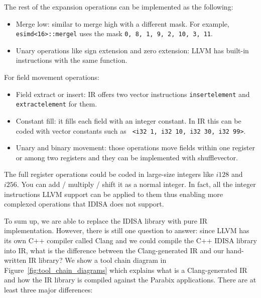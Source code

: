 The rest of the expansion operations can be implemented as the following:
\begin{itemize}
    \item Merge low: similar to merge high with a different mask. For example, {\tt esimd<16>::mergel} uses the mask {\tt 0, 8, 1, 9, 2, 10, 3, 11}.
    \item Unary operations like sign extension and zero extension: LLVM has built-in instructions with the same function.
\end{itemize}

For field movement operations:
\begin{itemize}
    \item Field extract or insert: IR offers two vector instructions {\tt insertelement} and {\tt extractelement} for them.
    \item Constant fill: it fills each field with an integer constant. In IR this can be coded with vector constants such as {\tt <4 x i32> <i32 1, i32 10, i32 30, i32 99>}.
    \item Unary and binary movement: those operations move fields within one register or among two registers and they can be implemented with shufflevector.
\end{itemize}

The full register operations could be coded in large-size integers like $i128$ and $i256$. You can add / multiply / shift it as a normal integer. In fact, all the integer instructions LLVM support can be applied to them thus enabling more complexed operations that IDISA does not support.

To sum up, we are able to replace the IDISA library with pure IR implementation. However, there is still one question to answer: since LLVM has its own C++ compiler called Clang and we could compile the C++ IDISA library into IR, what is the difference between the Clang-generated IR and our hand-written IR library? We show a tool chain diagram in Figure~\ref{fig:tool_chain_diagrams} which explains what is a Clang-generated IR and how the IR library is compiled against the Parabix applications. There are at least three major differences:

